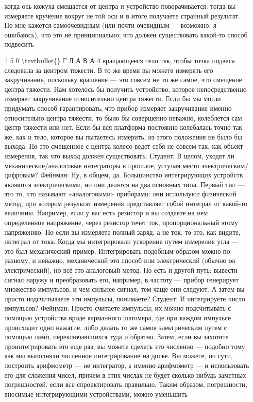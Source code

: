 \documentclass[10pt,oneside]{article}
\begin{document}
когда ось кожуха смещается от центра и устройство поворачивается; тогда вы измеряете кручение вокруг не той оси и в итоге получаете странный результат. Но мне кажется самоочевидным (или почти очевидным --- возможно, я ошибаюсь), что это не принципиально; что должен существовать какой-то способ подвесить\par

1 5 0 \textbackslash{}textbullet\{\} Г Л А В А  4 вращающееся тело так, чтобы точка подвеса следовала за центром тяжести. В то же время вы можете измерять его закручивание, поскольку вращение --- это совсем не то же самое, что смещение центра тяжести. Нам хотелось бы получить устройство, которое непосредственно измеряет закручивание относительно центра тяжести. Если бы мы могли придумать способ гарантировать, что прибор измеряет закручивание именно относительно центра тяжести, то было бы совершенно неважно, колеблется сам центр тяжести или нет. Если бы вся платформа постоянно колебалась точно так же, как и тело, которое вы пытаетесь измерить, из этого положения не было бы выхода. Но это смещенное с центра колесо ведет себя не совсем так, как объект измерения, так что выход должен существовать. Студент: В целом, уходят ли механические/аналоговые интеграторы в прошлое, уступая место электрическим/цифровым? Фейнман: Ну, в общем, да. Большинство интегрирующих устройств являются электрическими, но они делятся на два основных типа. Первый тип --- это то, что называют «аналоговыми» приборами: они используют физический метод, при котором результат измерения представляет собой интеграл от какой-то величины. Например, если у вас есть резистор и вы создаете на нем определенное напряжение, через резистор течет ток, пропорциональный этому напряжению. Но если вы измеряете полный заряд, а не ток, то это, как видите, интеграл от тока. Когда мы интегрировали ускорение путем измерения угла --- это был механический пример. Интегрировать подобным образом можно по-разному, и неважно, механический это способ или электрический (обычно он электрический), но всё это аналоговый метод. Но есть и другой путь: вывести сигнал наружу и преобразовать его, например, в частоту --- прибор генерирует множество импульсов, и чем сильнее сигнал, тем чаще они следуют. А затем вы просто подсчитываете эти импульсы, понимаете? Студент: И интегрируете число импульсов? Фейнман: Просто считаете импульсы; их можно подсчитывать с помощью устройства вроде карманного шагомера, где при каждом импульсе происходит одно нажатие, либо делать то же самое электрическим путем с помощью ламп, переключающихся туда и обратно. Затем, если вы захотите проинтегрировать это еще раз, вы можете сделать это численно --- подобно тому, как мы выполняли численное интегрирование на доске. Вы можете, по сути, построить арифмометр --- не интегратор, а именно арифмометр --- и использовать его для сложения чисел, причем в этих числах не будет сколько-нибудь заметных погрешностей, если все спроектировать правильно. Таким образом, погрешности, вносимые интегрирующими устройствами, можно уменьшить\par
\end{document}

